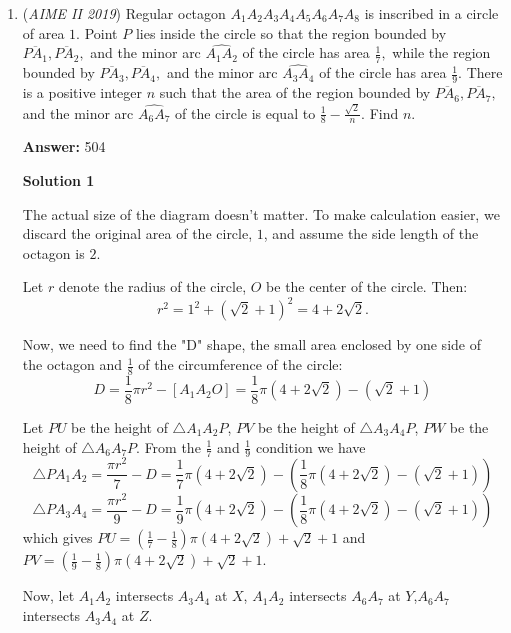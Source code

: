 \begin{enumerate}
 -scrabbler94

 


 


	\item (\textit{AIME II 2019}) Regular octagon $A_1A_2A_3A_4A_5A_6A_7A_8$ is inscribed in a circle of area $1.$ Point $P$ lies inside the circle so that the region bounded by $\overline{PA_1},\overline{PA_2},$ and the minor arc $\widehat{A_1A_2}$ of the circle has area $\frac{1}{7},$ while the region bounded by $\overline{PA_3},\overline{PA_4},$ and the minor arc $\widehat{A_3A_4}$ of the circle has area $\frac{1}{9}.$ There is a positive integer $n$ such that the area of the region bounded by $\overline{PA_6},\overline{PA_7},$ and the minor arc $\widehat{A_6A_7}$ of the circle is equal to $\frac{1}{8}-\frac{\sqrt2}{n}.$ Find $n.$

 \textbf{Answer: }504



\textbf{Solution 1}

The actual size of the diagram doesn't matter. To make calculation easier, we discard the original area of the circle, \(1\), and assume the side length of the octagon is \(2\). 

 Let \(r\) denote the radius of the circle, \(O\) be the center of the circle. Then:
 \[r^2= 1^2 + \left(\sqrt{2}+1\right)^2= 4+2\sqrt{2}.\]

 Now, we need to find the "D" shape, the small area enclosed by one side of the octagon and \(\frac{1}{8}\) of the circumference of the circle: 
 \[D= \frac{1}{8} \pi r^2 - [A_1 A_2 O]=\frac{1}{8} \pi \left(4+2\sqrt{2}\right)- \left(\sqrt{2}+1\right)\]

 Let \(PU\) be the height of \(\triangle A_1 A_2 P\), \(PV\) be the height of \(\triangle A_3 A_4 P\), \(PW\) be the height of \(\triangle A_6 A_7 P\). From the \(\frac{1}{7}\) and \(\frac{1}{9}\) condition we have 
 \[\triangle P A_1 A_2= \frac{\pi r^2}{7} - D= \frac{1}{7} \pi \left(4+2\sqrt{2}\right)-\left(\frac{1}{8} \pi \left(4+2\sqrt{2}\right)- \left(\sqrt{2}+1\right)\right)\]
 \[\triangle P A_3 A_4= \frac{\pi r^2}{9} - D= \frac{1}{9} \pi \left(4+2\sqrt{2}\right)-\left(\frac{1}{8} \pi \left(4+2\sqrt{2}\right)- \left(\sqrt{2}+1\right)\right)\]which gives \(PU= \left(\frac{1}{7}-\frac{1}{8}\right) \pi \left(4+ 2\sqrt{2}\right) + \sqrt{2}+1\) and \(PV= \left(\frac{1}{9}-\frac{1}{8}\right) \pi \left(4+ 2\sqrt{2}\right) + \sqrt{2}+1\). 

 Now, let \(A_1 A_2\) intersects \(A_3 A_4\) at \(X\), \(A_1 A_2\) intersects \(A_6 A_7\) at \(Y\),\(A_6 A_7\) intersects \(A_3 A_4\) at \(Z\). 


\end{enumerate}
